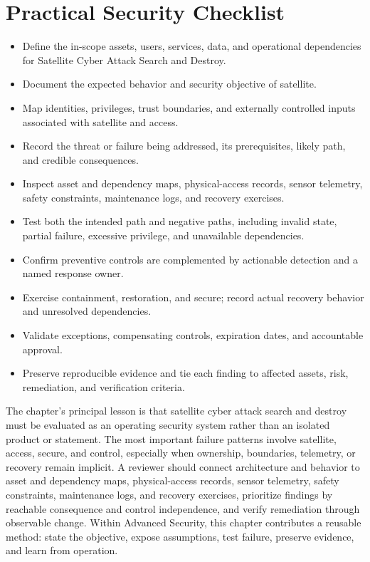 \documentclass[11pt]{article}
\begin{document}
\section*{Practical Security Checklist}
\begin{itemize}[label=$\square$]
\item Define the in-scope assets, users, services, data, and operational dependencies for Satellite Cyber Attack Search and Destroy.
\item Document the expected behavior and security objective of satellite.
\item Map identities, privileges, trust boundaries, and externally controlled inputs associated with satellite and access.
\item Record the threat or failure being addressed, its prerequisites, likely path, and credible consequences.
\item Inspect asset and dependency maps, physical-access records, sensor telemetry, safety constraints, maintenance logs, and recovery exercises.
\item Test both the intended path and negative paths, including invalid state, partial failure, excessive privilege, and unavailable dependencies.
\item Confirm preventive controls are complemented by actionable detection and a named response owner.
\item Exercise containment, restoration, and secure; record actual recovery behavior and unresolved dependencies.
\item Validate exceptions, compensating controls, expiration dates, and accountable approval.
\item Preserve reproducible evidence and tie each finding to affected assets, risk, remediation, and verification criteria.
\end{itemize}
\begin{synthesisbox}
The chapter's principal lesson is that satellite cyber attack search and destroy must be evaluated as an operating security system rather than an isolated product or statement. The most important failure patterns involve satellite, access, secure, and control, especially when ownership, boundaries, telemetry, or recovery remain implicit. A reviewer should connect architecture and behavior to asset and dependency maps, physical-access records, sensor telemetry, safety constraints, maintenance logs, and recovery exercises, prioritize findings by reachable consequence and control independence, and verify remediation through observable change. Within Advanced Security, this chapter contributes a reusable method: state the objective, expose assumptions, test failure, preserve evidence, and learn from operation.
\end{synthesisbox}
\end{document}
